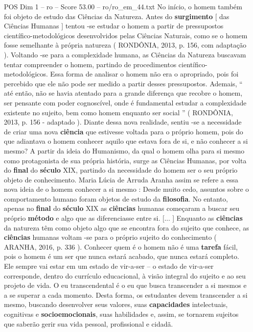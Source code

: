 \begin{textsample}{POS Dim 1 – ro – Score 53.00 – ro/ro\_em\_44.txt}
No início, o homem também foi objeto de estudo das Ciências da Natureza.
Antes do \textbf{surgimento} [ das Ciências Humanas ] tentou -se estudar o homem a partir de pressupostos científico-metodológicos desenvolvidos pelas Ciências Naturais, como se o homem fosse semelhante à própria natureza ( RONDÔNIA, 2013, p. 156, com adaptação ).
Voltando -se para a complexidade humana, as Ciências da Natureza buscavam tentar compreender o homem, partindo de procedimentos científico-metodológicos.
Essa forma de analisar o homem não era o apropriado, pois foi percebido que ele não pode ser medido a partir desses pressupostos.
Ademais, “ até então, não se havia atentado para a grande diferença que recobre o homem, ser pensante com poder cognoscível, onde é fundamental estudar a complexidade existente no sujeito, bem como homem enquanto ser social ” ( RONDÔNIA, 2013, p. 156 - adaptado ).
Diante dessa nova realidade, sentiu -se a necessidade de criar uma nova \textbf{ciência} que estivesse voltada para o próprio homem, pois do que adiantava o homem conhecer aquilo que estava fora de si, e não conhecer a si mesmo?
A partir da ideia do Humanismo, da qual o homem olha para si mesmo como protagonista de sua própria história, surge as Ciências Humanas, por volta do \textbf{final} do \textbf{século} XIX, partindo da necessidade do homem ser o seu próprio objeto de conhecimento.
Maria Lúcia de Arruda Aranha assim se refere a essa nova ideia de o homem conhecer a si mesmo : Desde muito cedo, assuntos sobre o comportamento humano foram objetos de estudo da \textbf{filosofia}.
No entanto, apenas no \textbf{final} do \textbf{século} XIX as \textbf{ciências} humanas começaram a buscar seu próprio \textbf{método} e algo que as diferenciasse entre si. [... ] Enquanto as \textbf{ciências} da natureza têm como objeto algo que se encontra fora do sujeito que conhece, as \textbf{ciências} humanas voltam -se para o próprio sujeito do conhecimento ( ARANHA, 2016, p. 336 ).
Conhecer quem é o homem não é uma \textbf{tarefa} fácil, pois o homem é um ser que nunca estará acabado, que nunca estará completo.
Ele sempre vai estar em um estado de vir-a-ser – o estado de vir-a-ser corresponde, dentro do currículo educacional, à visão integral do sujeito e ao seu projeto de vida.
O eu transcendental é o eu que busca transcender a si mesmos e a se superar a cada momento.
Desta forma, os estudantes devem transcender a si mesmo, buscando desenvolver seus valores, suas \textbf{capacidades} intelectuais, cognitivas e \textbf{socioemocionais}, suas habilidades e, assim, se tornarem sujeitos que saberão gerir sua vida pessoal, profissional e cidadã.

\end{textsample}
